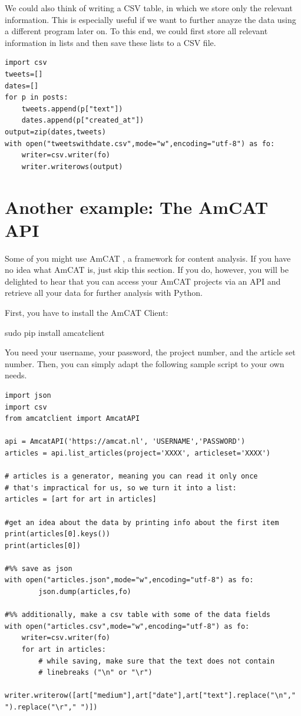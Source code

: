 \documentclass[a4paper,12pt]{book}
\begin{document}
We could also think of writing a CSV table, in which we store only the relevant information. This is especially useful if we want to further anayze the data using a different program later on. To this end, we could first store all relevant information in lists and then save these lists to a CSV file.


\begin{lstlisting}
import csv
tweets=[]
dates=[]
for p in posts:
	tweets.append(p["text"])
	dates.append(p["created_at"])
output=zip(dates,tweets)
with open("tweetswithdate.csv",mode="w",encoding="utf-8") as fo:
	writer=csv.writer(fo)
	writer.writerows(output) 
\end{lstlisting}




\section{Another example: The AmCAT API}
Some of you might use AmCAT \citep{VanAtteveldt2008}, a framework for content analysis. If you have no idea what AmCAT is, just skip this section. If you do, however, you will be delighted to hear that you can access your AmCAT projects via an API and retrieve all your data for further analysis with Python.

First, you have to install the AmCAT Client:

\begin{lstlistingbash}
sudo pip install amcatclient
\end{lstlistingbash}


You need your username, your password, the project number, and the article set number. Then, you can simply adapt the following sample script to your own needs.

\begin{lstlisting}
import json
import csv
from amcatclient import AmcatAPI

api = AmcatAPI('https://amcat.nl', 'USERNAME','PASSWORD')
articles = api.list_articles(project='XXXX', articleset='XXXX')

# articles is a generator, meaning you can read it only once
# that's impractical for us, so we turn it into a list:
articles = [art for art in articles]

#get an idea about the data by printing info about the first item
print(articles[0].keys())
print(articles[0])

#%% save as json
with open("articles.json",mode="w",encoding="utf-8") as fo:
        json.dump(articles,fo)
 
#%% additionally, make a csv table with some of the data fields
with open("articles.csv",mode="w",encoding="utf-8") as fo:
    writer=csv.writer(fo)
    for art in articles:
        # while saving, make sure that the text does not contain 
        # linebreaks ("\n" or "\r")
        writer.writerow([art["medium"],art["date"],art["text"].replace("\n"," ").replace("\r"," ")]) 
\end{lstlisting}
\end{document}
